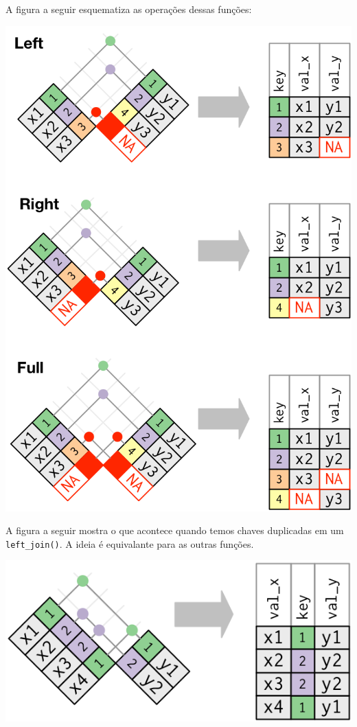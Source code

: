 \documentclass[
]{book}
\begin{document}
A figura a seguir esquematiza as operações dessas funções:

\begin{center}\includegraphics[width=9.86in]{img/manipulacao/joins} \end{center}

A figura a seguir mostra o que acontece quando temos chaves duplicadas em um \texttt{left\_join()}. A ideia é equivalante para as outras funções.

\begin{center}\includegraphics[width=7.75in]{img/manipulacao/left-join} \end{center}
\end{document}
